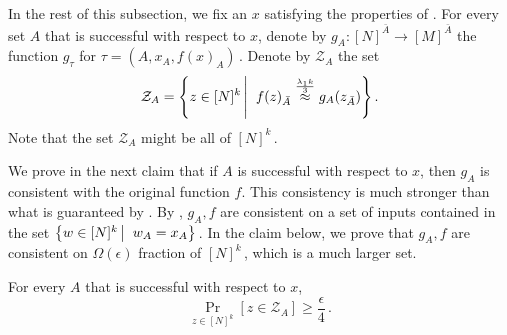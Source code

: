 \documentclass{toc}
\newcommand{\Prob}[2][]{\Pr_{{#1}}\left[#2\right]} %
\newcommand\sett[2]{\left\{ #1 \left| \; \vphantom{#1 #2} \right. #2  \right\}} %
\newcommand\f{f} %
\newcommand{\g}{g} %
\newcommand\neql[1]{\stackrel{{#1}}{ \approx}} %
\newcommand\rest[1]{{\bar{#1}}}  %
\newcommand\zi{\mathcal{Z}} %
\begin{document}
In the rest of this subsection, we fix an $x$ satisfying the properties of .
For every set $A$ that is successful with respect to $x$, denote by $\g_A:[N]^{\rest{A}}\rightarrow[M]^{\rest{A}}$ the function $\g_\tau$ for $\tau = (A,x_A,\f(x)_A)$\,.
Denote by $\zi_A$ the set
\[\zi_A = \sett{z\in[N]^k}{\f(z)_{\rest{A}}\neql{\frac{\lambda_1 k}{3}}\g_A(z_{\rest{A}})}. \]
Note that the set $\zi_A$ might be all of $[N]^k$\,.

We prove in the next claim that if $A$ is successful with respect to $x$, then $\g_A$ is consistent with the original function $\f$. This consistency is much stronger than what is guaranteed by . By , $\g_A,\f$ are consistent on a set of inputs contained in the set $\sett{w\in [N]^k}{w_A=x_A}$\,. In the claim below, we prove that $\g_A,\f$ are consistent on $\Omega(\epsilon)$ fraction of $[N]^k$\,, which is a much larger set.
\begin{claim} \label{claim:z in zi_A}
	For every $A$ that is successful with respect to $x$, 
	\[\Prob[{z\in[N]^k}]{z\in\zi_A}\geq\frac{\epsilon}{4}\,.\] %
\end{claim}
\end{document}
